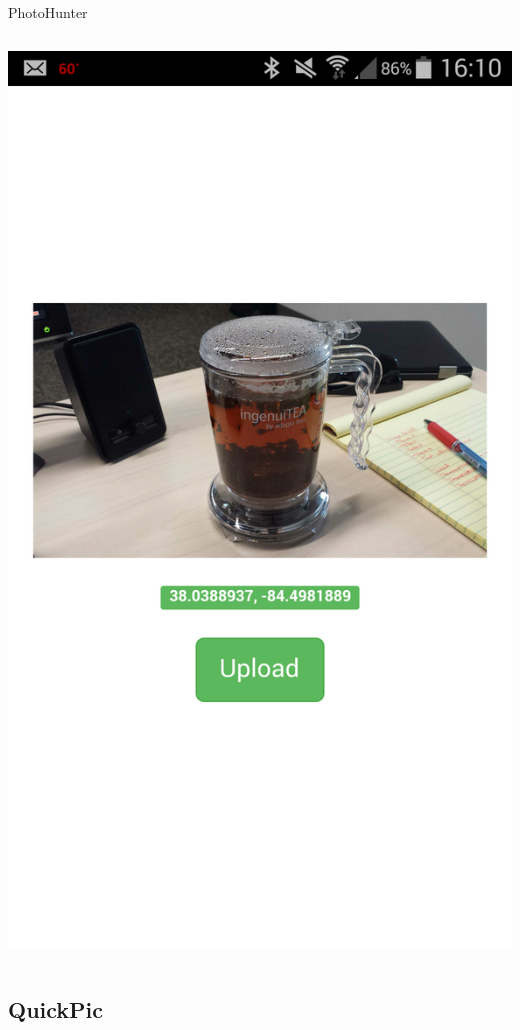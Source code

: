 \documentclass[aspectratio=169]{beamer}
\begin{document}
\begin{frame}{PhotoHunter}
\begin{columns}[c]
\begin{column}{0.3\columnwidth}
      \includegraphics[width=\textwidth,height=\textheight,keepaspectratio]{photohunter/submit}
    \end{column}
  \end{columns}
\end{frame}

\subsection{QuickPic}
\end{document}
